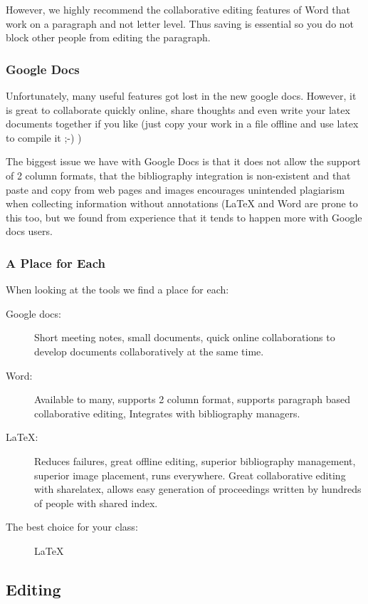 However, we highly recommend the collaborative editing features of Word
that work on a paragraph and not letter level. Thus saving is essential
so you do not block other people from editing the paragraph.

\subsubsection{Google Docs}\label{google-docs}

Unfortunately, many useful features got lost in the new google docs.
However, it is great to collaborate quickly online, share thoughts and
even write your latex documents together if you like (just copy your
work in a file offline and use latex to compile it ;-) )

The biggest issue we have with Google Docs is that it does not allow the
support of 2 column formats, that the bibliography integration is
non-existent and that paste and copy from web pages and images
encourages unintended plagiarism when collecting information without
annotations (LaTeX and Word are prone to this too, but we found from
experience that it tends to happen more with Google docs users.

\subsubsection{A Place for Each}\label{a-place-for-each}

When looking at the tools we find a place for each:

\begin{description}
\item[Google docs:]
Short meeting notes, small documents, quick online collaborations to
develop documents collaboratively at the same time.
\item[Word:]
Available to many, supports 2 column format, supports paragraph based
collaborative editing, Integrates with bibliography managers.
\item[LaTeX:]
Reduces failures, great offline editing, superior bibliography
management, superior image placement, runs everywhere. Great
collaborative editing with sharelatex, allows easy generation of
proceedings written by hundreds of people with shared index.
\item[The best choice for your class:]
LaTeX
\end{description}

\subsection{Editing}\label{editing}

